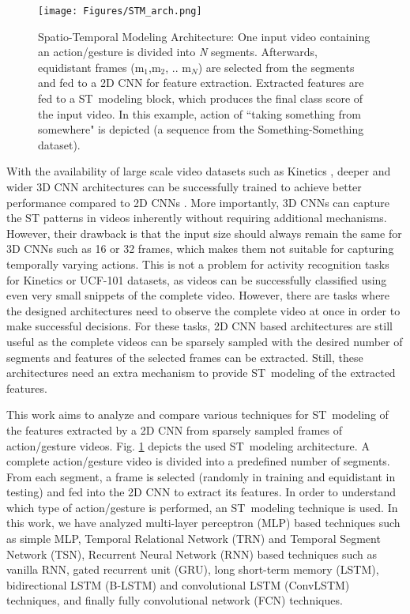 \documentclass[runningheads]{llncs}
\begin{document}
\begin{figure}[t!]
	\centering
	\texttt{[image: Figures/STM\_arch.png]}
	\caption{Spatio-Temporal Modeling Architecture: One input video containing an action/gesture is divided into \textit{N} segments. Afterwards, equidistant frames (m${_1}$,m${_2}$, .. m${_N}$) are selected from the segments and fed to a 2D CNN for feature extraction. Extracted features are fed to a ST~modeling block, which produces the final class score of the input video. In this example, action of ``taking something from somewhere" is depicted (a sequence from the Something-Something dataset).}
	\label{fig:STM_arch}
	\vspace{-0.3cm}
\end{figure}


With the availability of large scale video datasets such as Kinetics \cite{carreira2017quo}, deeper and wider 3D CNN architectures can be successfully trained to achieve better performance compared to 2D CNNs \cite{hara2018can}. More importantly, 3D CNNs can capture the ST patterns in videos inherently without requiring additional mechanisms. However, their drawback is that the input size should always remain the same for 3D CNNs such as 16 or 32 frames, which makes them not suitable for capturing temporally varying actions. This is not a problem for activity recognition tasks for Kinetics \cite{carreira2017quo} or UCF-101 \cite{soomro2012ucf101} datasets, as videos can be successfully classified using even very small snippets of the complete video. However, there are tasks where the designed architectures need to observe the complete video at once in order to make successful decisions. For these tasks, 2D CNN based architectures are still useful as the complete videos can be sparsely sampled with the desired number of segments and features of the selected frames can be extracted. Still, these architectures need an extra mechanism to provide ST~modeling of the extracted features. 

This work aims to analyze and compare various techniques for ST~modeling of the features extracted by a 2D CNN from sparsely sampled frames of action/gesture videos. Fig. \ref{fig:STM_arch} depicts the used ST~modeling architecture. A complete action/gesture video is divided into a predefined number of segments. From each segment, a frame is selected (randomly in training and equidistant in testing) and fed into the 2D CNN to extract its features. In order to understand which type of action/gesture is performed, an ST~modeling technique is used. In this work, we have analyzed multi-layer perceptron (MLP) based techniques such as simple MLP, Temporal Relational Network (TRN) and Temporal Segment Network (TSN), Recurrent Neural Network (RNN) based techniques such as vanilla RNN, gated recurrent unit (GRU), long short-term memory (LSTM),  bidirectional LSTM (B-LSTM) and convolutional LSTM (ConvLSTM) techniques, and finally fully convolutional network (FCN) techniques.
\end{document}
